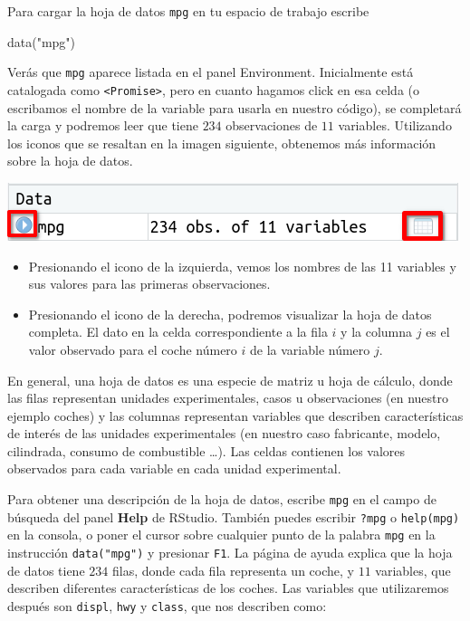 \documentclass[
  title=normal,
  notoc,
  bib=normal]{mnye}
\newenvironment{Shaded}{\begin{snugshade}}{\end{snugshade}}
\newcommand{\FunctionTok}[1]{\textcolor[rgb]{0.00,0.00,0.00}{#1}}
\newcommand{\NormalTok}[1]{#1}
\newcommand{\StringTok}[1]{\textcolor[rgb]{0.31,0.60,0.02}{#1}}
\begin{document}
Para cargar la hoja de datos \texttt{mpg} en tu espacio de trabajo escribe

\begin{Shaded}
\begin{Highlighting}[]
\FunctionTok{data}\NormalTok{(}\StringTok{"mpg"}\NormalTok{)}
\end{Highlighting}
\end{Shaded}

Verás que \texttt{mpg} aparece listada en el panel Environment. Inicialmente está catalogada como \texttt{\textless{}Promise\textgreater{}}, pero en cuanto hagamos click en esa celda (o escribamos el nombre de la variable para usarla en nuestro código), se completará la carga y podremos leer que tiene \(234\) observaciones de \(11\) variables. Utilizando los iconos que se resaltan en la imagen siguiente, obtenemos más información sobre la hoja de datos.

\begin{center}\includegraphics[width=0.6\linewidth]{images/df} \end{center}

\begin{itemize}
\item
  Presionando el icono de la izquierda, vemos los nombres de las 11 variables y sus valores para las primeras observaciones.
\item
  Presionando el icono de la derecha, podremos visualizar la hoja de datos completa. El dato en la celda correspondiente a la fila \(i\) y la columna \(j\) es el valor observado para el coche número \(i\) de la variable número \(j\).
\end{itemize}

En general, una hoja de datos es una especie de matriz u hoja de cálculo, donde las filas representan unidades experimentales, casos u observaciones (en nuestro ejemplo coches) y las columnas representan variables que describen características de interés de las unidades experimentales (en nuestro caso fabricante, modelo, cilindrada, consumo de combustible \ldots). Las celdas contienen los valores observados para cada variable en cada unidad experimental.

Para obtener una descripción de la hoja de datos, escribe \texttt{mpg} en el campo de búsqueda del panel \textbf{Help} de \textsf{RStudio}. También puedes escribir \texttt{?mpg} o \texttt{help(mpg)} en la consola, o poner el cursor sobre cualquier punto de la palabra \texttt{mpg} en la instrucción \texttt{data("mpg")} y presionar \texttt{F1}. La página de ayuda explica que la hoja de datos tiene \(234\) filas, donde cada fila representa un coche, y \(11\) variables, que describen diferentes características de los coches. Las variables que utilizaremos después son \texttt{displ}, \texttt{hwy} y \texttt{class}, que nos describen como:
\end{document}
